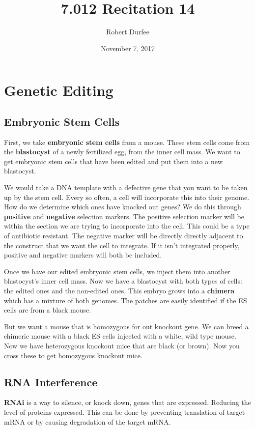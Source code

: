 \documentclass{article}
\title{7.012 Recitation 14}
\author{Robert Durfee}
\date{November 7, 2017}
\begin{document}
\maketitle

\section{Genetic Editing}

\subsection{Embryonic Stem Cells}

First, we take \textbf{embryonic stem cells} from a mouse. These stem cells come
from the \textbf{blastocyst} of a newly fertilized egg, from the inner cell
mass. We want to get embryonic stem cells that have been edited and put them
into a new blastocyst.

We would take a DNA template with a defective gene that you want to be taken up
by the stem cell. Every so often, a cell will incorporate this into their
genome. How do we determine which ones have knocked out genes? We do this
through \textbf{positive} and \textbf{negative} selection markers. The positive
selection marker will be within the section we are trying to incorporate into
the cell. This could be a type of antibiotic resistant. The negative marker will
be directly directly adjacent to the construct that we want the cell to
integrate. If it isn't integrated properly, positive and negative markers will
both be included.

Once we have our edited embryonic stem cells, we inject them into another
blastocyst's inner cell mass. Now we have a blastocyst with both types of cells:
the edited ones and the non-edited ones. This embryo grows into a
\textbf{chimera} which has a mixture of both genomes. The patches are easily
identified if the ES cells are from a black mouse. 

But we want a mouse that is homozygous for out knockout gene. We can breed a
chimeric mouse with a black ES cells injected with a white, wild type mouse. Now
we have heterozygous knockout mice that are black (or brown). Now you cross
these to get homozygous knockout mice.

\subsection{RNA Interference}

\textbf{RNAi} is a way to silence, or knock down, genes that are expressed.
Reducing the level of proteins expressed. This can be done by preventing
translation of target mRNA or by causing degradation of the target mRNA. 
\end{document}

